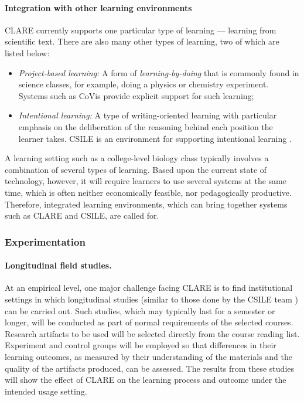 \paragraph{Integration with other learning environments}

CLARE currently supports one particular type of learning --- learning from
scientific text. There are also many other types of learning, two of which
are listed below:

\begin{itemize}
\item {\it Project-based learning:\/} A form of {\it learning-by-doing\/}
  that is commonly found in science classes, for example, doing a physics
  or chemistry experiment. Systems such as CoVis \cite{Pea93} provide
  explicit support for such learning;
  
\item {\it Intentional learning:\/} A type of writing-oriented learning
  with particular emphasis on the deliberation of the reasoning behind each
  position the learner takes. CSILE is an environment for supporting
  intentional learning \cite{Scardamadia93}.
\end{itemize}

A learning setting such as a college-level biology class typically involves
a combination of several types of learning. Based upon the current state of
technology, however, it will require learners to use several systems at the
same time, which is often neither economically feasible, nor pedagogically
productive. Therefore, integrated learning environments, which can bring
together systems such as CLARE and CSILE, are called for.


\subsubsection{Experimentation}

\paragraph{Longitudinal field studies.}

At an empirical level, one major challenge facing CLARE is to find
institutional settings in which longitudinal studies (similar to those done
by the CSILE team \cite{Scardamadia93}) can be carried out. Such studies,
which may typically last for a semester or longer, will be conducted
as part of normal requirements of the selected courses. Research artifacts
to be used will be selected directly from the course reading list.
Experiment and control groups will be employed so that differences in their
learning outcomes, as measured by their understanding of the materials and
the quality of the artifacts produced, can be assessed. The results from
these studies will show the effect of CLARE on the learning process and
outcome under the intended usage setting.


